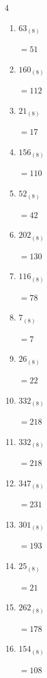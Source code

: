 \begin{multicols}{4}
\begin{enumerate}
        $=114$

  \item $63_{(8)}$

        $=51$

  \item $160_{(8)}$

        $=112$

  \item $21_{(8)}$

        $=17$

  \item $156_{(8)}$

        $=110$

  \item $52_{(8)}$

        $=42$

  \item $202_{(8)}$

        $=130$

\columnbreak %

  \item $116_{(8)}$

        $=78$

  \item $7_{(8)}$

        $=7$

  \item $26_{(8)}$

        $=22$

  \item $332_{(8)}$

        $=218$

  \item $332_{(8)}$

        $=218$

  \item $347_{(8)}$

        $=231$

  \item $301_{(8)}$

        $=193$

  \item $25_{(8)}$

        $=21$

  \item $262_{(8)}$

        $=178$

  \item $154_{(8)}$

        $=108$


\end{enumerate}
\end{multicols}
